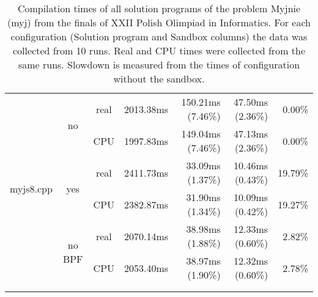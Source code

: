 \documentclass[en]{pracamgr}
\begin{document}
\begin{appendices}
\begin{small}
\begin{longtable}{|l|c|c|r|r|r|r|}
\hline
\multirow{6}{*}{myjs8.cpp}  & \multirow{2}{*}{no}     & real & 2013.38ms & 150.21ms (7.46\%) & 47.50ms (2.36\%) & 0.00\% \\*
                            &                         & CPU  & 1997.83ms & 149.04ms (7.46\%) & 47.13ms (2.36\%) & 0.00\% \\*
                            \cline{2-7}
                            & \multirow{2}{*}{yes}    & real & 2411.73ms & 33.09ms (1.37\%) & 10.46ms (0.43\%) & 19.79\% \\*
                            &                         & CPU  & 2382.87ms & 31.90ms (1.34\%) & 10.09ms (0.42\%) & 19.27\% \\*
                            \cline{2-7}
                            & \multirow{2}{*}{no BPF} & real & 2070.14ms & 38.98ms (1.88\%) & 12.33ms (0.60\%) & 2.82\% \\*
                            &                         & CPU  & 2053.40ms & 38.97ms (1.90\%) & 12.32ms (0.60\%) & 2.78\% \\
\hline
\multicolumn{1}{c}{}\\ %
\caption{Compilation times of all solution programs of the problem Myjnie (myj) from the finals of XXII Polish Olimpiad in Informatics. For each configuration (Solution program and Sandbox columns) the data was collected from 10 runs. Real and CPU times were collected from the same runs. Slowdown is measured from the times of configuration without the sandbox.}
\label{table:myj_compilation}
\end{longtable}
\end{small}


\end{appendices}
\end{document}
